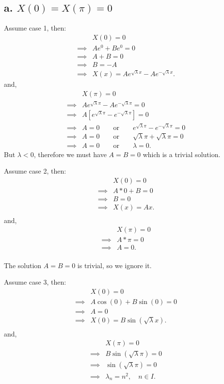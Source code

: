 \documentclass{article}
\begin{document}
\subsection*{a. \underline{$X(0) = X(\pi) = 0$}}
Assume case 1, then:
\begin{align*}
  &X(0) = 0 \\
  \implies& A e^{0} + B e^{0} = 0 \\
  \implies& A + B = 0 \\
  \implies& B = - A \\
  \implies& X(x) = A e^{\sqrt{\lambda} x} - A e^{-\sqrt{\lambda} x}.
\end{align*}
and,
\begin{align*}
  &X(\pi) = 0 \\
  \implies& Ae^{\sqrt{\lambda}\pi} - Ae^{-\sqrt{\lambda} \pi} = 0 \\
  \implies& A [e^{\sqrt{\lambda}\pi} - e^{-\sqrt{\lambda} \pi}] = 0 \\
  \implies& A = 0 \qquad \text{or} \qquad e^{\sqrt{\lambda}\pi} - e^{-\sqrt{\lambda} \pi} = 0 \\
  \implies& A = 0 \qquad \text{or} \qquad \sqrt{\lambda}\pi + \sqrt{\lambda} \pi  = 0 \\
  \implies& A = 0 \qquad \text{or} \qquad \lambda = 0.
\end{align*}
But $\lambda < 0$, therefore we must have $A = B = 0$ which is a trivial solution.
\newline

\noindent
Assume case 2, then:
\begin{align*}
  &X(0) = 0 \\
  \implies& A*0 + B = 0 \\
  \implies& B = 0 \\
  \implies& X(x) = Ax. \\
\end{align*}
and,
\begin{align*}
  &X(\pi) = 0 \\
  \implies& A*\pi = 0 \\
  \implies& A = 0. \\
\end{align*}

The solution $A=B=0$ is trivial, so we ignore it.

\noindent
Assume case 3, then:
\begin{align*}
  &X(0) = 0 \\
  \implies&A \cos(0) + B \sin(0) = 0 \\
  \implies&A = 0 \\
  \implies&X(0) = B \sin(\sqrt{\lambda} x).\\
\end{align*}
and,
\begin{align*}
  &X(\pi) = 0 \\
  \implies& B \sin(\sqrt{\lambda} \pi) = 0 \\
  \implies& \sin(\sqrt{\lambda} \pi) = 0 \\
  \implies& \lambda_n = n^2, \quad n \in I. \\
\end{align*}
\newline
\end{document}
